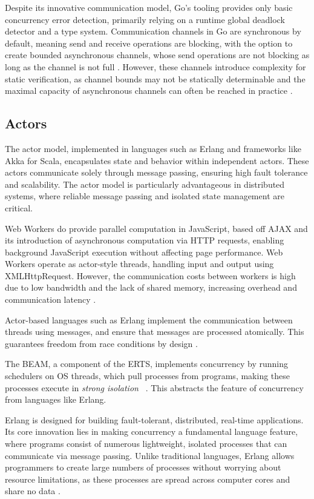 \documentclass[]{interim}
\begin{document}
Despite its innovative communication model, Go's tooling provides only basic
concurrency error detection, primarily relying on a runtime global deadlock
detector and a type system. Communication channels
in Go are synchronous by default, meaning send and receive operations are
blocking, with the option to create bounded asynchronous channels, whose
send operations are not blocking as long as the channel
is not full \cite{lange_empirical_2019}. However, these channels
introduce complexity for static verification, as channel bounds may not be
statically determinable and the maximal capacity of
asynchronous channels can often be reached in practice \cite{lange_empirical_2019}.

\subsection{Actors}
The actor model, implemented in languages such as Erlang and frameworks
like Akka for Scala, encapsulates state and behavior within independent actors.
These actors communicate solely through message passing, ensuring high fault
tolerance and scalability. The actor model is particularly advantageous in
distributed systems, where reliable message passing and isolated state
management are critical.

Web Workers do provide parallel computation in JavaScript, based off AJAX and its
introduction of asynchronous computation via HTTP requests, enabling background
JavaScript execution without affecting page performance. Web Workers operate as
actor-style threads, handling input and output using
XMLHttpRequest. However, the communication costs between workers
is high due to low bandwidth and the lack of shared memory,
increasing overhead and communication latency \cite{namiot_js_2015}.

Actor-based languages such as Erlang
implement the communication between threads
using messages, and ensure that messages are processed
atomically. This guarantees freedom from race conditions
by design \cite{bianchi_survey_2018}.

The BEAM, a component of the ERTS, implements concurrency by running schedulers
on OS threads, which pull processes from programs, making these processes execute in
\textit{strong isolation} ~\cite{stenman_erlang_2024, armstrong_making_2003, debenedetto_elixir_2019}.
This abstracts the feature of concurrency from languages like Erlang.

Erlang is designed for building fault-tolerant, distributed, real-time
applications. Its core innovation lies in making concurrency a fundamental
language feature, where programs consist of numerous lightweight,
isolated processes that can communicate via message passing.
Unlike traditional languages, Erlang allows programmers to
create large numbers of processes without worrying about resource limitations,
as these processes are spread across computer cores and share no data \cite{armstrong_erlang_2010}.
\end{document}
